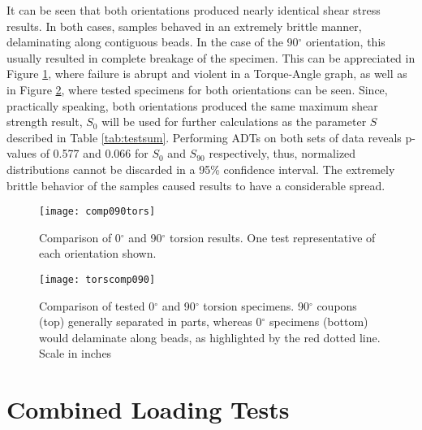 \documentclass[main.tex]{subfiles}
\begin{document}
It can be seen that both orientations produced nearly identical shear stress results. In both cases, samples behaved in an extremely brittle manner, delaminating along contiguous beads. In the case of the 90$^\circ$ orientation, this usually resulted in complete breakage of the specimen. This can be appreciated in Figure \ref{fig:090comptors}, where failure is abrupt and violent in a Torque-Angle graph, as well as in Figure \ref{fig:090ctors}, where tested specimens for both orientations can be seen. Since, practically speaking, both orientations produced the same maximum shear strength result, $S_0$ will be used for further calculations as the parameter $S$ described in Table \ref{tab:testsum}. Performing ADTs on both sets of data reveals p-values of 0.577 and 0.066 for $S_0$ and $S_{90}$ respectively, thus, normalized distributions cannot be discarded in a 95\% confidence interval. The extremely brittle behavior of the samples caused results to have a considerable spread.

\newpage

\begin{figure}[!htbp]
	\center
	\texttt{[image: comp090tors]}
	\captionsetup{justification=centering} %
	\caption[Comparison of 0$^\circ$ and 90$^\circ$ torsion results]{Comparison of 0$^\circ$ and 90$^\circ$ torsion results. One test representative of each orientation shown.} \label{fig:090comptors}
\end{figure}

\begin{figure}[!htbp]
	\center
	\texttt{[image: torscomp090]}
	\captionsetup{justification=centering} %
	\caption[Comparison of tested 0$^\circ$ and 90$^\circ$ torsion specimens]{Comparison of tested 0$^\circ$ and 90$^\circ$ torsion specimens. 90$^\circ$ coupons (top) generally separated in parts, whereas 0$^\circ$ specimens (bottom) would delaminate along beads, as highlighted by the red dotted line. Scale in inches} \label{fig:090ctors}
\end{figure}
   
\section{Combined Loading Tests} \label{sec:clr}
\end{document}
